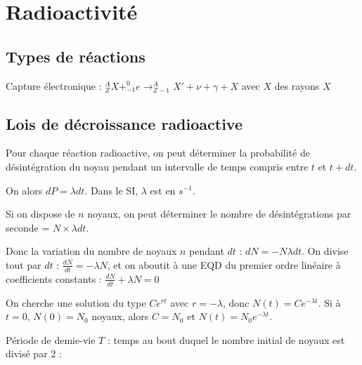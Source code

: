 \documentclass[french]{yLectureNote}
\begin{document}
\section{Radioactivité}
\subsection{Types de réactions}


Capture électronique : $^A_ZX + ^0_{-1}e \rightarrow _{Z-1}^{A}X' + \nu + \gamma + X$ avec $X$ des rayons $X$
\subsection{Lois de décroissance radioactive}
Pour chaque réaction radioactive, on peut déterminer la probabilité de désintégration du noyau pendant un intervalle de temps compris entre $t$ et $t+dt$.

On alors $dP = \lambda dt$. Dans le SI, $\lambda$ est en $s^{-1}$.

Si on dispose de $n$ noyaux, on peut déterminer le nombre de désintégrations par seconde = $N\times \lambda dt$.

Donc la variation du nombre de noyaux $n$ pendant $dt$ : $dN = -N\lambda dt$. On divise tout par $dt$ : $\frac{dN}{dt} = -\lambda N$, et on aboutit à une EQD du premier ordre linéaire à coefficients constants : $\frac{dN}{dt} +\lambda N= 0 $

On cherche une solution du type $Ce^{rt}$ avec $r=-\lambda$, donc $N(t) = Ce^{-\lambda t}$. Si à $t=0$, $N(0) = N_0$ noyaux, alors $C=N_0$ et $N(t) = N_0e^{-\lambda t}$.

Période de demie-vie $T$ : temps au bout duquel le nombre initial de noyaux est divisé par $2$ :
\end{document}
